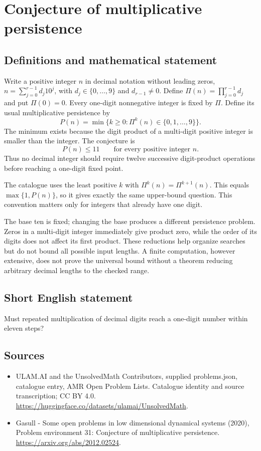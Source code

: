 \documentclass[11pt,a4paper]{article}
\begin{document}
\section*{Conjecture of multiplicative persistence}\label{statement}

\subsection{Definitions and mathematical statement}
Write a positive integer $n$ in decimal notation without leading zeros,
$n=\sum_{j=0}^{r-1}d_j10^j$, with $d_j\in\{0,\ldots,9\}$ and
$d_{r-1}\ne0$. Define $\Pi(n)=\prod_{j=0}^{r-1}d_j$ and put
$\Pi(0)=0$. Every one-digit nonnegative integer is fixed by $\Pi$.
Define its usual multiplicative persistence by
\[
 P(n)=\min\{k\ge0:\Pi^k(n)\in\{0,1,\ldots,9\}\}.
\]
The minimum exists because the digit product of a multi-digit positive
integer is smaller than the integer. The conjecture is
\[
 P(n)\le11\qquad\text{for every positive integer }n.
\]
Thus no decimal integer should require twelve successive digit-product
operations before reaching a one-digit fixed point.

The catalogue uses the least positive $k$ with
$\Pi^k(n)=\Pi^{k+1}(n)$. This equals $\max\{1,P(n)\}$, so it gives
exactly the same upper-bound question. This convention matters only for
integers that already have one digit.

The base ten is fixed; changing the base produces a different persistence
problem. Zeros in a multi-digit integer immediately give product zero,
while the order of its digits does not affect its first product. These
reductions help organize searches but do not bound all possible input
lengths. A finite computation, however extensive, does not prove the
universal bound without a theorem reducing arbitrary decimal lengths
to the checked range.
\subsection{Short English statement}
Must repeated multiplication of decimal digits reach a one-digit number within eleven steps?
\subsection{Sources}
\begin{itemize}
\item[S1] ULAM.AI and the UnsolvedMath Contributors, supplied problems.json, catalogue entry, AMR Open Problem Lists. Catalogue identity and source transcription; CC BY 4.0.
\url{https://huggingface.co/datasets/ulamai/UnsolvedMath}.
\item[S2] Gasull - Some open problems in low dimensional dynamical systems (2020), Problem environment 31: Conjecture of multiplicative persistence. 
\url{https://arxiv.org/abs/2012.02524}.
\end{itemize}
\end{document}
